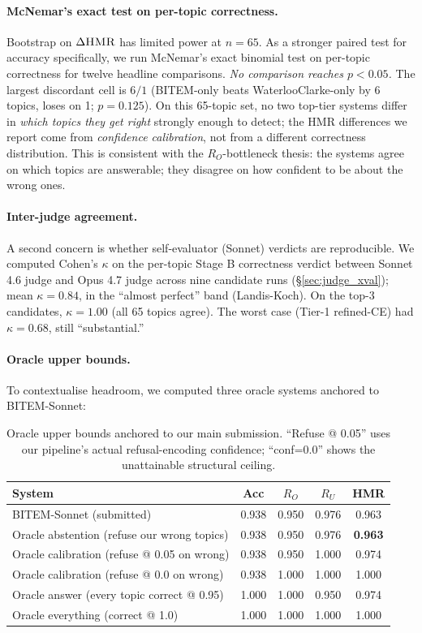 \documentclass[11pt,a4paper]{article}
\newcommand{\HMR}{\textsc{HMR}}
\begin{document}
\paragraph{McNemar's exact test on per-topic correctness.}
Bootstrap on $\Delta\HMR$ has limited power at $n=65$. As a stronger
paired test for accuracy specifically, we run McNemar's exact
binomial test on per-topic correctness for twelve headline
comparisons. \emph{No comparison reaches $p<0.05$.} The largest
discordant cell is $6/1$ (BITEM-only beats WaterlooClarke-only by 6
topics, loses on 1; $p=0.125$). On this 65-topic set, no two
top-tier systems differ in \emph{which topics they get right}
strongly enough to detect; the HMR differences we report come from
\emph{confidence calibration}, not from a different correctness
distribution. This is consistent with the $R_O$-bottleneck thesis:
the systems agree on which topics are answerable; they disagree on
how confident to be about the wrong ones.

\paragraph{Inter-judge agreement.} A second concern is whether
self-evaluator (Sonnet) verdicts are reproducible. We computed
Cohen's $\kappa$ on the per-topic Stage B correctness verdict between
Sonnet 4.6 judge and Opus 4.7 judge across nine candidate runs
(\S\ref{sec:judge_xval}); mean $\kappa = 0.84$, in the
``almost perfect'' band (Landis-Koch). On the top-3 candidates,
$\kappa = 1.00$ (all 65 topics agree). The worst case (Tier-1
refined-CE) had $\kappa = 0.68$, still ``substantial.''

\paragraph{Oracle upper bounds.}
To contextualise headroom, we computed three oracle systems anchored
to BITEM-Sonnet:

\begin{table}[h]
\centering
\caption{Oracle upper bounds anchored to our main submission. ``Refuse @
0.05'' uses our pipeline's actual refusal-encoding confidence;
``conf=0.0'' shows the unattainable structural ceiling.}
\label{tab:oracle_bounds}
\small
\begin{tabular}{lcccc}
\toprule
System & Acc & $R_O$ & $R_U$ & \HMR \\
\midrule
BITEM-Sonnet (submitted)                       & 0.938 & 0.950 & 0.976 & 0.963 \\
\midrule
Oracle abstention (refuse our wrong topics)    & 0.938 & 0.950 & 0.976 & \textbf{0.963} \\
Oracle calibration (refuse @ 0.05 on wrong)    & 0.938 & 0.950 & 1.000 & 0.974 \\
Oracle calibration (refuse @ 0.0 on wrong)     & 0.938 & 1.000 & 1.000 & 1.000 \\
Oracle answer (every topic correct @ 0.95)     & 1.000 & 1.000 & 0.950 & 0.974 \\
Oracle everything (correct @ 1.0)              & 1.000 & 1.000 & 1.000 & 1.000 \\
\bottomrule
\end{tabular}
\end{table}
\end{document}
